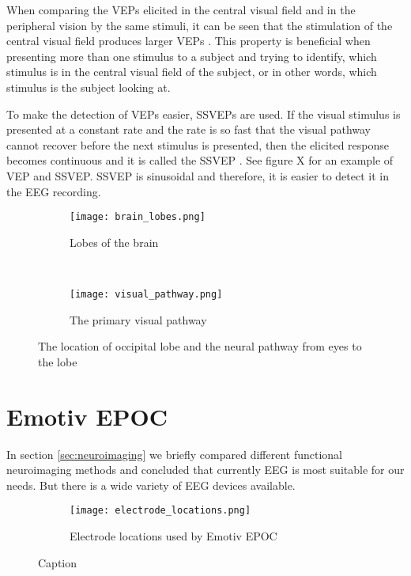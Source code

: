 When comparing the \glspl{VEP} elicited in the central visual field and in the peripheral vision by the same stimuli, it can be seen that the stimulation of the central visual field produces larger \glspl{VEP} \cite{VEP_size}. This property is beneficial when presenting more than one stimulus to a subject and trying to identify, which stimulus is in the central visual field of the subject, or in other words, which stimulus is the subject looking at. 

To make the detection of \glspl{VEP} easier, \glspl{SSVEP} are used. If the visual stimulus is presented at a constant rate and the rate is so fast that the visual pathway cannot recover before the next stimulus is presented, then the elicited response becomes continuous and it is called the \gls{SSVEP} \cite{VEP}. See figure X for an example of \gls{VEP} and \gls{SSVEP}. \gls{SSVEP} is sinusoidal and therefore, it is easier to detect it in the \gls{EEG} recording.

\begin{figure}[h]
	\centering
	\begin{subfigure}{0.48\textwidth}
		\texttt{[image: brain\_lobes.png]}
		\caption{Lobes of the brain \cite{blausen}}
		\label{fig:brain_lobes}
	\end{subfigure}
	~
	\begin{subfigure}{0.48\textwidth}
		\texttt{[image: visual\_pathway.png]}
		\caption{The primary visual pathway \cite[p.~261]{neuroscience}}
		\label{fig:visual_pathway}
	\end{subfigure}
	\caption{The location of occipital lobe and the neural pathway from eyes to the lobe}
	\label{fig:lobes_pathway}
\end{figure}

\section{Emotiv EPOC}

In section \ref{sec:neuroimaging} we briefly compared different functional neuroimaging methods and concluded that currently \gls{EEG} is most suitable for our needs. But there is a wide variety of EEG devices available.

\begin{figure}[h]
	\centering
	\begin{subfigure}{0.48\textwidth}
		\texttt{[image: electrode\_locations.png]}
		\caption{Electrode locations used by Emotiv EPOC\protect\footnotemark}
		\label{fig:electrode_locations}
	\end{subfigure}
	\caption{Caption}
	\label{fig:label}
\end{figure}

